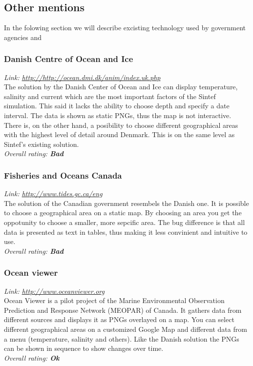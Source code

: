 \documentclass[11pt,a4paper,titlepage,oneside]{report}
\begin{document}
\subsection{Other mentions}
In the folowing section we will describe excisting technology used by government agencies and
\subsubsection{Danish Centre of Ocean and Ice}
\emph{Link: \url{http://http://ocean.dmi.dk/anim/index.uk.php }} \\%
  The solution by the Danish Center of Ocean and Ice can display temperature, salinity and current which are the most important factors of the Sintef simulation. This said it lacks the ability to choose depth and specify a date interval. The data is shown as static PNGs, thus the map is not interactive. There is, on the other hand, a posibility to choose different geographical areas with the highest level of detail around Denmark. This is on the same level as Sintef's existing solution.
\\ \emph{Overall rating: \textbf{Bad}}

\subsubsection{Fisheries and Oceans Canada}
\emph{Link: \url{http://www.tides.gc.ca/eng}} \\%
  The solution of the Canadian government resembels the Danish one. It is possible to choose a geographical area on a static map. By choosing an area you get the oppotunity to choose a smaller, more sepcific area. The bug difference is that all data is presented as text in tables, thus making it less convinient and intuitive to use.
\\ \emph{Overall rating: \textbf{Bad}}

\subsubsection{Ocean viewer}
\emph{Link: \url{http://www.oceanviewer.org}} \\%
  Ocean Viewer is a pilot project of the Marine Environmental Observation Prediction and Response Network (MEOPAR) of Canada. It gathers data from different sources and displays it as PNGs overlayed on a map. You can select different geographical areas on a customized Google Map and different data from a menu (temperature, salinity and others). Like the Danish solution the PNGs can be shown in sequence to show changes over time.
\\ \emph{Overall rating: \textbf{Ok}}
\end{document}
